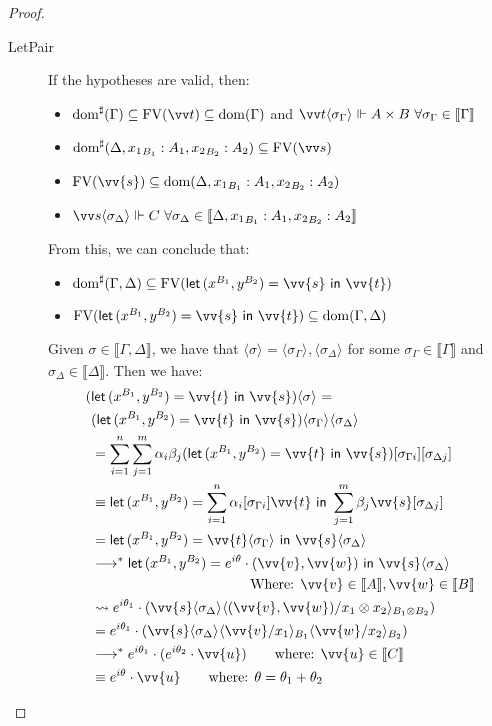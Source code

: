 \documentclass[runningheads,orivec,envcountsame,envcountsect]{llncs}
\newcommand\lra{\longrightarrow}
\newcommand\ansubst[2]{\ensuremath{\langle #1 \rangle_{#2}}}
\newcommand\dom[1]{\mathrm{dom}(#1)}
\newcommand\sdom[1]{\mathrm{dom}^{\sharp}(#1)}
\newcommand\FV[1]{\mathrm{FV}(#1)}
\def\Pair#1#2{(#1,#2)} %
\def\letkeyword{\mathsf{let}}
\def\inkeyword{\mathsf{in}}
\def\LetP#1#2#3#4#5#6{\letkeyword\,\Pair{#1^{#2}}{#3^{#4}}=#5~\inkeyword~#6}
\def\lraneq{\rightsquigarrow}
\def\eval{\lra^*}
\def\sem#1{\llbracket#1\rrbracket}
\begin{document}
\begin{proof}
\begin{description}
    \item[LetPair] If the hypotheses are valid, then:
    \begin{itemize}
        \item $\sdom{\Gamma}\subseteq \FV{\vv t} \subseteq \dom{\Gamma}$ and $\vv t \ansubst{\sigma_\Gamma}{}\Vdash A\times B\ \forall \sigma_\Gamma\in\sem\Gamma$
        \item $\sdom{\Delta, {x_1}_{B_1}:A_1, {x_2}_{B_2}:A_2}\subseteq\FV{\vv s}$
        \item $\FV{\vv{s}}\subseteq \dom{\Delta,{x_1}_{B_1}:A_1, {x_2}_{B_2}:A_2}$
        \item $\vv s \ansubst{\sigma_\Delta}{}\Vdash C\ \forall \sigma_\Delta\in\sem{\Delta, {x_1}_{B_1}:A_1, {x_2}_{B_2}:A_2}$
    \end{itemize}
    From this, we can conclude that:
    \begin{itemize}
        \item $\sdom{\Gamma,\Delta}\subseteq\FV{\LetP{x}{B_1}{y}{B_2}{\vv{s}}{\vv{t}}}$
        \item $\FV{\LetP{x}{B_1}{y}{B_2}{\vv{s}}{\vv{t}}}\subseteq\dom{\Gamma,\Delta}$
    \end{itemize}
    
    Given $\sigma\in\sem{\Gamma,\Delta}$, we have that $\ansubst{\sigma}{}=\ansubst{\sigma_\Gamma}{},\ansubst{\sigma_\Delta}{}$ for some $\sigma_\Gamma\in\sem\Gamma$ and $\sigma_\Delta\in\sem\Delta$. Then we have:
    \begin{align*}
        (&\LetP{x}{B_1}{y}{B_2}{\vv{t}}{\vv{s}})\ansubst{\sigma}{} = \\
        &(\LetP{x}{B_1}{y}{B_2}{\vv{t}}{\vv{s}})\ansubst{\sigma_\Gamma}{}\ansubst{\sigma_\Delta}{}\\
        &= \sum_{i=1}^{n}\sum_{j=1}^{m}\alpha_i\beta_j(\LetP{x}{B_1}{y}{B_2}{\vv{t}}{\vv{s}})[\sigma_{\Gamma i}][\sigma_{\Delta j}]\\
        &\equiv \LetP{x}{B_1}{y}{B_2}{\sum_{i=1}^{n}\alpha_i[\sigma_{\Gamma i}]\vv{t}}{\sum_{j=1}^{m}\beta_j \vv{s}[\sigma_{\Delta j}]}\\
        &= \LetP{x}{B_1}{y}{B_2}{\vv{t}\ansubst{\sigma_\Gamma}{}}{\vv{s}\ansubst{\sigma_\Delta}{}}\\
        &\eval \LetP{x}{B_1}{y}{B_2}{e^{i\theta}\cdot\Pair{\vv{v}}{\vv{w}}}{\vv{s}\ansubst{\sigma_\Delta}{}}\\
        &\hspace*{4cm}{\text{Where: }}\vv{v}\in\sem{A},\vv{w}\in\sem{B}\\
        &\lraneq e^{i\theta_1}\cdot(\vv{s}\ansubst{\sigma_\Delta}{}\ansubst{\Pair{\vv{v}}{\vv{w}}/x_1\otimes x_2}{B_1\otimes B_2})\\
        &= e^{i\theta_1}\cdot(\vv{s}\ansubst{\sigma_\Delta}{}\ansubst{\vv{v}/x_1}{B_1}\ansubst{\vv{w}/x_2}{B_2})\\
        &\eval e^{i\theta_1}\cdot (e^{i\theta_2}\cdot \vv{u})\qquad\text{where: }\vv{u}\in\sem{C}\\
        &\equiv e^{i\theta}\cdot \vv{u}\qquad\text{where: }\theta=\theta_1 + \theta_2
    \end{align*}
    

\end{description}
\end{proof}
\end{document}
